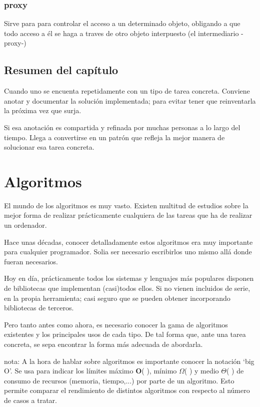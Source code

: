 \documentclass[spanish,12pt,a4paper,final,oneside]{book}
\begin{document}
\subsection{proxy}
Sirve para para controlar el acceso a un determinado objeto, obligando a que todo acceso a él se haga a traves de otro objeto interpuesto (el intermediario -proxy-)

\section*{Resumen del capítulo}
Cuando uno se encuenta repetidamente con un tipo de tarea concreta. Conviene anotar y documentar la solución implementada; para evitar tener que reinventarla la próxima vez que surja.

Si esa anotación es compartida y refinada por muchas personas a lo largo del tiempo. Llega a convertirse en un patrón que refleja la mejor manera de solucionar esa tarea concreta.




\chapter{Algoritmos}
El mundo de los algoritmos es muy vasto. Existen multitud de estudios sobre la mejor forma de realizar prácticamente cualquiera de las tareas que ha de realizar un ordenador.

Hace unas décadas, conocer detalladamente estos algoritmos era muy importante para cualquier programador. Solia ser necesario escribirlos uno mismo allá donde fueran necesarios. 

Hoy en día, prácticamente todos los sistemas y lenguajes más populares disponen de bibliotecas que implementan (casi)todos ellos. Si no vienen incluidos de serie, en la propia herramienta; casi seguro que se pueden obtener incorporando bibliotecas de terceros.

Pero tanto antes como ahora, es necesario conocer la gama de algoritmos existentes y los principales usos de cada tipo. De tal forma que, ante una tarea concreta, se sepa encontrar la forma más adecuada de abordarla. 

nota: A la hora de hablar sobre algoritmos es importante conocer la notación `big O'. Se usa para indicar los límites máximo \textbf{O}( ), mínimo \textbf{$\Omega$}( ) y medio \textbf{$\Theta$}( ) de consumo de recursos (memoria, tiempo,...) por parte de un algoritmo. Esto permite comparar el rendimiento de distintos algoritmos con respecto al número de casos a tratar.
\end{document}
